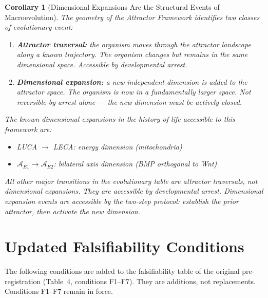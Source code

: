 \documentclass[12pt, a4paper]{article}
\newtheorem{corollary}[theorem]{Corollary}
\theoremstyle{definition}
\theoremstyle{remark}
\begin{document}
\begin{corollary}[Dimensional Expansions Are the
Structural Events of Macroevolution]
The geometry of the Attractor Framework identifies two
classes of evolutionary event:
\begin{enumerate}[label=(\roman*)]
  \item \textbf{Attractor traversal:} the organism moves
        through the attractor landscape along a known
        trajectory. The organism changes but remains in
        the same dimensional space. Accessible by
        developmental arrest.
  \item \textbf{Dimensional expansion:} a new independent
        dimension is added to the attractor space. The
        organism is now in a fundamentally larger space.
        Not reversible by arrest alone --- the new
        dimension must be actively closed.
\end{enumerate}

The known dimensional expansions in the history of life
accessible to this framework are:
\begin{itemize}[noitemsep]
  \item LUCA $\to$ LECA: energy dimension (mitochondria)
  \item $\mathcal{A}_{E1} \to \mathcal{A}_{E2}$:
        bilateral axis dimension (BMP orthogonal to Wnt)
\end{itemize}

All other major transitions in the evolutionary table
are attractor traversals, not dimensional expansions.
They are accessible by developmental arrest. Dimensional
expansion events are accessible by the two-step
protocol: establish the prior attractor, then activate
the new dimension.
\end{corollary}

\section{Updated Falsifiability Conditions}

The following conditions are added to the falsifiability
table of the original pre-registration (Table~4,
conditions F1--F7). They are additions, not replacements.
Conditions F1--F7 remain in force.
\end{document}

